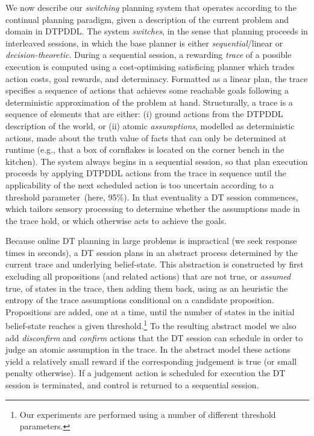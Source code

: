 
We now describe our {\em switching} planning system that operates
according to the continual planning paradigm, given a description of
the current problem and domain in DTPDDL. The system {\em
switches}, in the sense that planning proceeds in interleaved
sessions, in which the base planner is either {\em sequential}/linear
or {\em decision-theoretic}.
During a sequential session, a rewarding {\em trace} of a possible
execution is computed using a cost-optimising satisficing planner
which trades action costs, goal rewards, and determinacy.
Formatted as a linear plan, the trace specifies a sequence of actions
that achieves some reachable goals following a deterministic
approximation of the problem at hand.
Structurally, a trace is a sequence of elements that are either: (i) ground
actions from the DTPDDL description of the world, or (ii) atomic {\em
assumptions}, modelled as deterministic actions, made about the truth
value of facts that can only be determined at runtime (e.g., that a
box of cornflakes is located on the corner bench in the kitchen).
The system always begins in a sequential session, so that plan
execution proceeds by applying DTPDDL actions from the trace in
sequence until the applicability of the next scheduled action is too
uncertain according to a threshold parameter~(here, 95\%). In that
eventuality a DT session commences, which tailors sensory processing
to determine whether the assumptions made in the trace hold, or which
otherwise acts to achieve the goals. 


Because online DT planning in large problems is impractical (we seek
response times in seconds), a DT session plans in an abstract process
determined by the current trace and underlying belief-state. This
abstraction is constructed by first excluding all propositions (and
related actions) that are not true, or {\em assumed } true, of states
in the trace, then adding them back, using as an heuristic the entropy
of the trace assumptions conditional on a candidate
proposition. Propositions are added, one at a time, until the number
of states in the initial belief-state reaches a given
threshold.\footnote{Our experiments are performed using a number of
different threshold parameters.}  To the resulting abstract model we
also add {\em disconfirm} and {\em confirm} actions that the
DT session can schedule in order to judge an atomic assumption
in the trace. In the abstract model these actions yield a relatively
small reward if the corresponding judgement is true (or small penalty
otherwise). If a judgement action is scheduled for execution the
DT session is terminated, and control is returned to a
sequential session.


